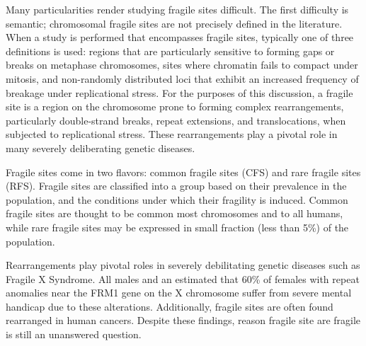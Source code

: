 Many particularities render studying fragile sites difficult.  The first difficulty is semantic; chromosomal fragile sites are not precisely
defined in the literature.  When a study is performed that encompasses fragile sites, typically one of three definitions is used: regions
that are particularly sensitive to forming gaps or breaks on metaphase chromosomes\cite{glover2005}, sites where chromatin fails to compact
under mitosis\cite{leyden2008}, and non-randomly distributed loci that exhibit an increased frequency of breakage under replicational
stress\cite{franchitto2013}.  For the purposes of this discussion, a \gls{fragile site} is a region on the chromosome prone to
forming complex rearrangements, particularly double-strand breaks, repeat extensions, and translocations, when subjected to replicational stress.
These rearrangements play a pivotal role in many severely deliberating genetic diseases.

Fragile sites come in two flavors: common fragile sites (CFS) and rare fragile sites (RFS).  Fragile sites are classified into a group based on their
prevalence in the population, and the conditions under which their fragility is induced\cite{leyden2008}.  Common fragile sites are thought to be common
most chromosomes and to all humans, while rare fragile sites may be expressed in small fraction (less than 5\%) of the population\cite{wells2006}.

Rearrangements play pivotal roles in severely debilitating genetic diseases such as Fragile X Syndrome.  All males and an estimated that 60\% of females
with repeat anomalies near the FRM1 gene on the X chromosome suffer from severe mental handicap due to these alterations\cite{sutherland1995}. Additionally,
fragile sites are often found rearranged in human cancers\cite{glover2005}.  Despite these findings, reason fragile site are fragile is still an
unanswered question.
